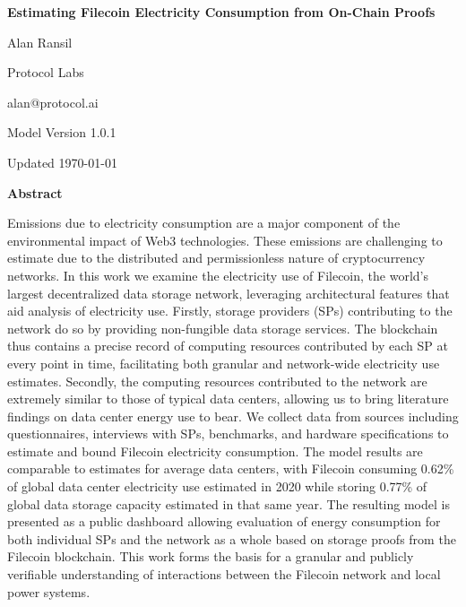 \documentclass[9pt, oneside]{article}   	%
\begin{document}
\newpage


\begin{center}
\Large{\textbf{Estimating Filecoin Electricity Consumption from On-Chain Proofs}}
\vspace{1 cm}

\normalsize{}
Alan Ransil

Protocol Labs

alan@protocol.ai

\vspace{1 cm}
Model Version 1.0.1

Updated \today

\vspace{1 cm}
\Large{\textbf{Abstract}}

\end{center}

\noindent Emissions due to electricity consumption are a major component of the environmental impact of Web3 technologies. These emissions are challenging to estimate due to the distributed and permissionless nature of cryptocurrency networks. In this work we examine the electricity use of Filecoin, the world’s largest decentralized data storage network, leveraging architectural features that aid analysis of electricity use. Firstly, storage providers (SPs) contributing to the network do so by providing non-fungible data storage services. The blockchain thus contains a precise record of computing resources contributed by each SP at every point in time, facilitating both granular and network-wide electricity use estimates. Secondly, the computing resources contributed to the network are extremely similar to those of typical data centers, allowing us to bring literature findings on data center energy use to bear. We collect data from sources including questionnaires, interviews with SPs, benchmarks, and hardware specifications to estimate and bound Filecoin electricity consumption. The model results are comparable to estimates for average data centers, with Filecoin consuming 0.62\% of global data center electricity use estimated in 2020 while storing 0.77\% of global data storage capacity estimated in that same year. The resulting model is presented as a public dashboard allowing evaluation of energy consumption for both individual SPs and the network as a whole based on storage proofs from the Filecoin blockchain. This work forms the basis for a granular and publicly verifiable understanding of interactions between the Filecoin network and local power systems.
\end{document}
